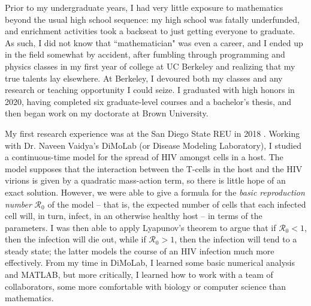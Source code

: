 \documentclass[11pt]{article}
\begin{document}
%
%
%
%
%
%

Prior to my undergraduate years, I had very little exposure to mathematics beyond the usual high school sequence: my high school was fatally underfunded, and enrichment activities took a backseat to just getting everyone to graduate.
As such, I did not know that ``mathematician" was even a career, and I ended up in the field somewhat by accident, after fumbling through programming and physics classes in my first year of college at UC Berkeley and realizing that my true talents lay elsewhere.
At Berkeley, I devoured both my classes and any research or teaching opportunity I could seize.
I graduated with high honors in 2020, having completed six graduate-level courses and a bachelor's thesis, and then began work on my doctorate at Brown University.

My first research experience was at the San Diego State REU in 2018 \cite{sdsu2018}.
Working with Dr. Naveen Vaidya's DiMoLab (or Disease Modeling Laboratory), I studied a continuous-time model for the spread of HIV amongst cells in a host.
The model supposes that the interaction between the T-cells in the host and the HIV virions is given by a quadratic mass-action term, so there is little hope of an exact solution.
However, we were able to give a formula for the \emph{basic reproduction number} $\mathcal R_0$ of the model -- that is, the expected number of cells that each infected cell will, in turn, infect, in an otherwise healthy host -- in terms of the parameters.
I was then able to apply Lyapunov's theorem to argue that if $\mathcal R_0 < 1$, then the infection will die out, while if $\mathcal R_0 > 1$, then the infection will tend to a steady state; the latter models the course of an HIV infection much more effectively.
From my time in DiMoLab, I learned some basic numerical analysis and MATLAB, but more critically, I learned how to work with a team of collaborators, some more comfortable with biology or computer science than mathematics.
\end{document}
